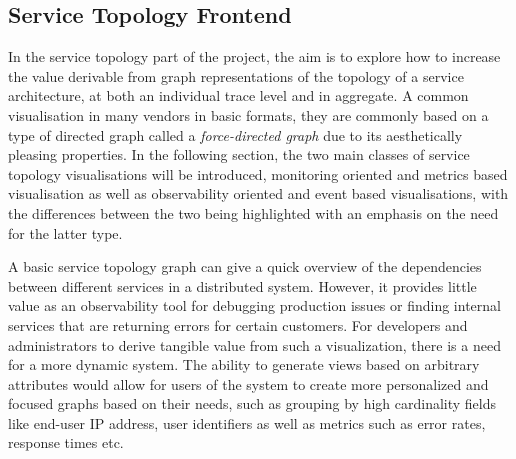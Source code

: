 \documentclass[12pt,pdftex,titlepage]{report}
\begin{document}
            \subsection{Service Topology Frontend}
                In the service topology part of the project, the aim is to explore how to increase the value derivable from graph representations of the topology of a service architecture, at 
                both an individual trace level and in aggregate. A common visualisation in many vendors in basic formats, they are commonly based on a type of directed graph called a 
                \textit{force-directed graph} due to its aesthetically pleasing properties. In the following section, the two main classes of service topology visualisations will be introduced,
                monitoring oriented and metrics based visualisation as well as observability oriented and event based visualisations, with the differences between the two being highlighted with an 
                emphasis on the need for the latter type.
        
                A basic service topology graph can give a quick overview of the dependencies between different services in a distributed system. However, it provides little value as an observability tool
                for debugging production issues or finding internal services that are returning errors for certain customers. For developers and administrators to derive tangible value from such a 
                visualization, there is a need for a more dynamic system. The ability to generate views based on arbitrary attributes would allow for users of the system to create more personalized and 
                focused graphs based on their needs, such as grouping by high cardinality fields like end-user IP address, user identifiers as well as metrics such as error rates, response times 
                etc\cite{doingitwrongtopo}.
\end{document}
